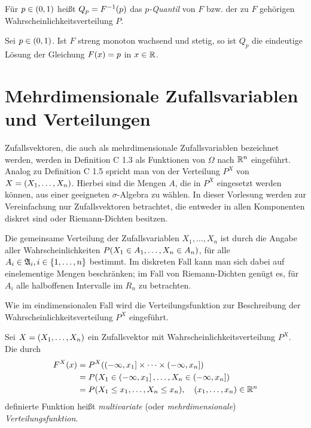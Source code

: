 \documentclass{lecture}
\begin{document}
    \begin{definition}
        Für \(p \in \parentheses*{0, 1}\) heißt \(Q_p = F^{-1}\parentheses*{p}\) das \emph{\(p\)-Quantil} von \(F\) bzw. der zu \(F\) gehörigen Wahrscheinlichkeitsverteilung \(P\).
    \end{definition}

    \begin{theorem}
        Sei \(p \in \parentheses*{0, 1}\).
        Ist \(F\) streng monoton wachsend und stetig, so ist \(Q_p\) die eindeutige Lösung der Gleichung \(F\parentheses*{x} = p\) in \(x \in \R\).
    \end{theorem}


    \section*{Mehrdimensionale Zufallsvariablen und Verteilungen}

    Zufallsvektoren, die auch als mehrdimensionale Zufallsvariablen bezeichnet werden, werden in Definition C 1.3 als Funktionen von \(\Omega\) nach \(\R^n\) eingeführt.
    Analog zu Definition C 1.5 spricht man von der Verteilung \(P^X\) von \(X = \parentheses*{X_1, \ldots, X_n}\).
    Hierbei sind die Mengen \(A\), die in \(P^X\) eingesetzt werden können, aus einer geeigneten \(\sigma\)-Algebra zu wählen.
    In dieser Vorlesung werden zur Vereinfachung nur Zufallsvektoren betrachtet, die entweder in allen Komponenten diskret sind oder Riemann-Dichten besitzen.

    Die gemeinsame Verteilung der Zufallsvariablen \(X_1, \ldots, X_n\) ist durch die Angabe aller Wahrscheinlichkeiten \(P\parentheses*{X_1 \in A_1, \ldots, X_n \in A_n}\), für alle \(A_i \in \mathfrak{A}_i, i \in \braces*{1, \ldots, n}\) bestimmt.
    Im diskreten Fall kann man sich dabei auf einelementige Mengen beschränken; im Fall von Riemann-Dichten genügt es, für \(A_i\) alle halboffenen Intervalle im \(R_n\) zu betrachten.
    
    Wie im eindimensionalen Fall wird die Verteilungsfunktion zur Beschreibung der Wahrscheinlichkeitsverteilung \(P^X\) eingeführt.

    \begin{definition}
        Sei \(X = \parentheses*{X_1, \ldots, X_n}\) ein Zufallsvektor mit Wahrscheinlichkeitsverteilung \(P^X\).
        Die durch
        \begin{align*}
            F^X\parentheses*{x} &= P^X\parentheses*{\left(-\infty, x_1\right] \times \cdots \times \left(-\infty, x_n\right]}\\
            &= P\parentheses*{X_1 \in \left(-\infty, x_1\right], \ldots, X_n \in \left(-\infty, x_n\right]}\\
            &= P\parentheses*{X_1 \le x_1, \ldots, X_n \le x_n}, \quad \parentheses*{x_1, \ldots, x_n} \in \R^n
        \end{align*}
        definierte Funktion heißt \emph{multivariate} (oder \emph{mehrdimensionale}) \emph{Verteilungsfunktion}.
    \end{definition}
\end{document}
